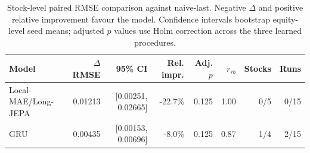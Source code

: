 \begin{table}[t]
\centering
\small
\caption{Stock-level paired RMSE comparison against naive-last. Negative $\Delta$ and positive relative improvement favour the model. Confidence intervals bootstrap equity-level seed means; adjusted $p$ values use Holm correction across the three learned procedures.}
\label{tab:paired_rmse_naive}
\begin{tabular}{lrrrrrrr}
\toprule
Model & $\Delta$RMSE & 95\% CI & Rel. impr. & Adj. $p$ & $r_{rb}$ & Stocks & Runs \\
\midrule
Local-MAE/Long-JEPA & 0.01213 & [0.00251, 0.02665] & -22.7\% & 0.125 & 1.00 & 0/5 & 0/15 \\
GRU & 0.00435 & [0.00153, 0.00696] & -8.0\% & 0.125 & 0.87 & 1/4 & 2/15 \\
\bottomrule
\end{tabular}
\end{table}
